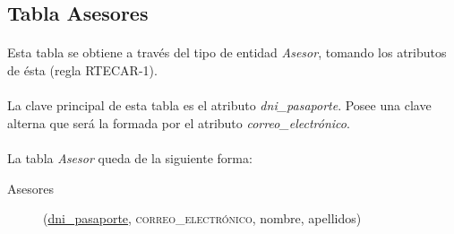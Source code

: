    \subsection{Tabla Asesores}

      \paragraph{}Esta tabla se obtiene a través del tipo de entidad
      \textit{Asesor}, tomando los atributos de ésta (regla RTECAR-1).

      \paragraph{}La clave principal de esta tabla es el atributo
      \textit{dni\_pasaporte}. Posee una clave alterna que será la formada por
      el atributo \textit{correo\_electrónico}.

      \paragraph{}La tabla \textit{Asesor} queda de la siguiente forma:

      \begin{description}
         \item[Asesores] \begin{flushleft}(\underline{dni\_pasaporte},
         \textsc{correo\_electrónico}, nombre, apellidos)\end{flushleft}
      \end{description}

